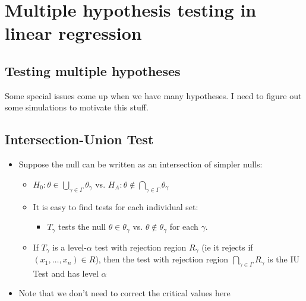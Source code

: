 

\section{Multiple hypothesis testing in linear regression}

\subsection{Testing multiple hypotheses}

Some special issues come up when we have many hypotheses.  I need to
figure out some simulations to motivate this stuff.

\subsection{Intersection-Union Test}

\begin{itemize}
\item Suppose the null can be written as an intersection of simpler
  nulls:
  \begin{itemize}
  \item $H_0: \theta \in \bigcup_{\gamma \in \Gamma} \theta_\gamma$ vs.  $H_A: \theta \notin \bigcap_{\gamma \in \Gamma} \theta_\gamma$
  \item It is easy to find tests for each individual set:
    \begin{itemize}
    \item $T_\gamma$ tests the null $\theta \in \theta_\gamma$ vs. $\theta \notin \theta_\gamma$ for each $\gamma$.
    \end{itemize}
  \item If $T_\gamma$ is a level-$\alpha$ test with rejection region $R_\gamma$ (ie
    it rejects if $(x_1,\dots,x_n) \in R$), then the test with rejection
    region $\bigcap_{\gamma \in \Gamma} R_\gamma$ is the IU Test and has level $\alpha$
  \end{itemize}
\item Note that we don't need to correct the critical values here
\end{itemize}

